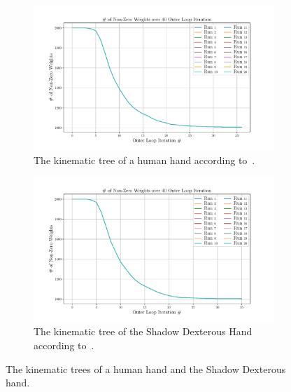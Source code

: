 \begin{figure}[!h]
	\centering
	\begin{subfigure}[b]{0.48\textwidth}
		\centering
		\includegraphics[width=\textwidth]{chapters/2-pose-estimation/fig/GNC-TLS-w-run-50-conv.pdf}
		\caption{The kinematic tree of a human hand according to~\cite{grasp-synthesis-algorithms-for-multifingered-robot-hands}.}
		\label{app:GNC-TLS-w-run-50-conv}
	\end{subfigure}
	\hfill
	\begin{subfigure}[b]{0.48\textwidth}
		\centering
		\includegraphics[width=\textwidth]{chapters/2-pose-estimation/fig/GNC-TLS-w-run-60-conv.pdf}
		\caption{The kinematic tree of the Shadow Dexterous Hand according to~\cite{robot-hand-kinematics}. \newline}
		\label{app:GNC-TLS-w-run-60-conv}
	\end{subfigure}
	\caption{The kinematic trees of a human hand and the Shadow Dexterous hand.}
	\label{app:GNC-TLS-w-run-50-60-conv}
\end{figure}
